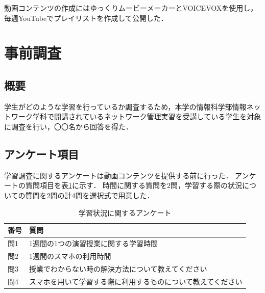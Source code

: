 \documentclass[12pt,a4j,titlepage]{ltjsarticle}
\begin{document}



動画コンテンツの作成にはゆっくりムービーメーカーとVOICEVOXを使用し，毎週YouTubeでプレイリストを作成して公開した．

\clearpage

\section{事前調査}
\subsection{概要}
学生がどのような学習を行っているか調査するため，本学の情報科学部情報ネットワーク学科で開講されているネットワーク管理実習を受講している学生を対象に調査を行い，〇〇名から回答を得た．


\subsection{アンケート項目}
学習調査に関するアンケートは動画コンテンツを提供する前に行った．
アンケートの質問項目を表\ref{tb:anke1}に示す．
時間に関する質問を2問，学習する際の状況についての質問を2問の計4問を選択式で用意した．

\begin{table}[htbp]
  \caption{学習状況に関するアンケート}
  \begin{center}
\begin{tabular}{ll}\hline
               番号 & 質問 \\ \hline
               問1 & 1週間の1つの演習授業に関する学習時間\\
               問2 & 1週間のスマホの利用時間\\
               問3 & 授業でわからない時の解決方法について教えてください\\
               問4 & スマホを用いて学習する際に利用するものについて教えてください\\
              \hline
               \end{tabular}
               \end{center}
               \label{tb:anke1}
               \end{table}
\end{document}
